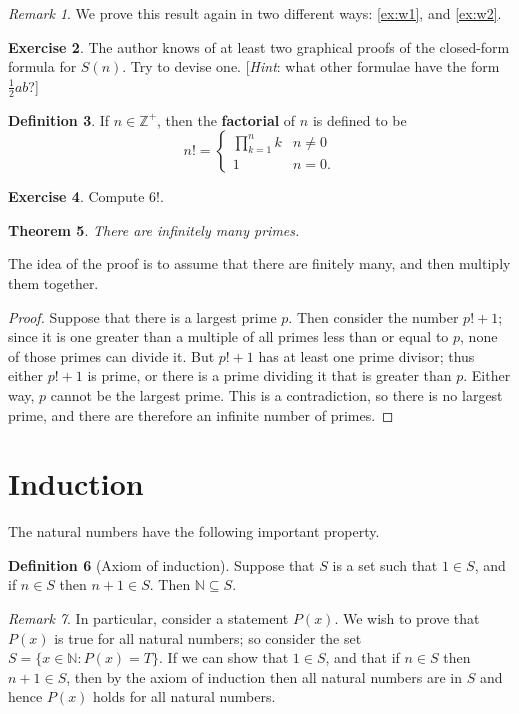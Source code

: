 \documentclass[a4paper, 10pt]{amsart}
\newtheorem{thm}{Theorem}[section]
\theoremstyle{definition}
\newtheorem{defn}[thm]{Definition}
\newtheorem{exercise}[thm]{Exercise}
\theoremstyle{remark}
\newtheorem{rem}[thm]{Remark}
\begin{document}
\begin{rem}
  We prove this result again in two different ways: \cref{ex:w1}, and \cref{ex:w2}.
\end{rem}

\begin{exercise}
  The author knows of at least two graphical proofs of the closed-form formula for $ S(n) $. Try to devise one. [\emph{Hint}: what other formulae
  have the form $ \frac{1}{2} ab $?]
\end{exercise}

\begin{defn}
  If $ n \in \mathbb{Z}^+ $, then the \textbf{factorial} of $ n $ is defined to be
  \begin{displaymath}
    n! = \begin{cases}
           \prod_{k = 1}^{n} k & n \neq 0\\
           1 & n = 0.
         \end{cases}
  \end{displaymath}
\end{defn}

\begin{exercise}
  Compute 6!.
\end{exercise}

\begin{thm}
  There are infinitely many primes.
\end{thm}
The idea of the proof is to assume that there are finitely many, and then multiply them together.
\begin{proof}
  Suppose that there is a largest prime $ p $. Then consider the number $ p! + 1 $; since it is one
  greater than a multiple of all primes less than or equal to $ p $, none of those primes can divide it.
  But $ p! + 1 $ has at least one prime divisor; thus either $ p! + 1 $ is prime, or there is a prime
  dividing it that is greater than $ p $. Either way, $ p $ cannot be the largest prime. This is a contradiction,
  so there is no largest prime, and there are therefore an infinite number of primes.
\end{proof}

\section{Induction}
The natural numbers have the following important property.
\begin{defn}[Axiom of induction]
  Suppose that $ S $ is a set such that $ 1 \in S $, and if $ n \in S $ then $ n + 1 \in S $.
  Then $ \mathbb{N} \subseteq S $.
\end{defn}
\begin{rem}
  In particular, consider a statement $ P(x) $. We wish to prove that $ P(x) $ is true
  for all natural numbers; so consider the set $ S = \{ x \in \mathbb{N} : P(x) = T \} $. If
  we can show that $ 1 \in S $, and that if $ n \in S $ then $ n + 1 \in S $, then by the axiom
  of induction then all natural numbers are in $ S $ and hence $ P(x) $ holds for all natural numbers.
\end{rem}
\end{document}
